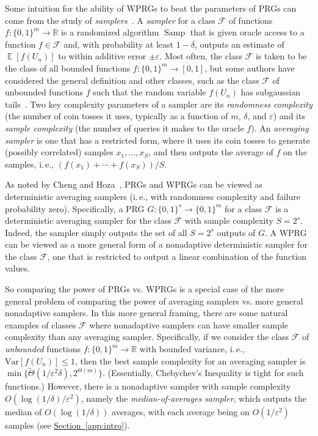 \documentclass[11pt]{article}
\numberwithin{equation}{section}
\theoremstyle{definition}
\theoremstyle{plain}
\newcommand{\ie}{i.\,e.}
\newcommand{\expref}[2]{\hyperref[#2]{#1~\ref{#2}}}
\newcommand{\eps}{\varepsilon}
\newcommand{\zo}{\{0,1\}}
\newcommand{\cF}{\mathcal{F}}
\newcommand{\bbR}{\mathbb{R}}
\DeclareMathOperator*{\E}{\mathbb{E}}
\DeclareMathOperator{\Samp}{Samp}
\begin{document}
Some intuition for the ability of WPRGs to beat the parameters of PRGs can come from
the study of \emph{samplers}~\cite{Goldreich97}.  A \emph{sampler} for a class $\cF$ of
functions $f : \zo^m\rightarrow \bbR$ is %
a 
%
randomized algorithm $\Samp$ that is given 
oracle access to a function $f\in \cF$ and, with probability at least $1-\delta$, outputs an estimate of $\E[f(U_n)]$ to within additive error $\pm \eps$. Most often, the class $\cF$ is taken to be the class of all bounded functions $f : \zo^m \rightarrow [0,1]$, but some
%
authors  %
have considered the general definition and other classes, such as the class $\cF$ of unbounded functions $f$ such that the random variable $f(U_n)$ has subgaussian tails~\cite{Blasiok18,Agrawal19}.  Two key complexity parameters of a sampler are its \emph{randomness complexity} (the number of coin tosses it uses, typically as a function of $m$, $\delta$, and $\eps$)  and its 
\emph{sample complexity} (the number of queries it makes to the oracle $f$).
An \emph{averaging sampler} is one that has a restricted form, where it uses its coin tosses to generate (possibly correlated) samples $x_1,\ldots,x_S$, and then outputs the average of $f$
on the samples, \ie, $(f(x_1)+\cdots+f(x_S))/S$.

As noted by Cheng and Hoza~\cite{ChengHo20}, PRGs and WPRGs can be viewed as deterministic averaging samplers (\ie, with randomness complexity and failure probability zero).  Specifically,
a PRG $G : \zo^s\rightarrow \zo^m$ for a class $\cF$ is a deterministic averaging sampler for the class $\cF$ with sample complexity $S=2^s$.  Indeed, the sampler simply outputs the set of all $S=2^s$ outputs of $G$. A WPRG can be viewed as a more general form of a nonadaptive deterministic sampler for the class $\cF$, one that is restricted to output a linear combination of the function values.

So comparing the power of PRGs vs. WPRGs is a special case of the more general problem of comparing the power of averaging samplers vs. more general nonadaptive samplers.  In this more general framing, there are some natural examples of classes $\cF$ where nonadaptive samplers can have smaller sample complexity than any averaging sampler.  Specifically, if we consider the class $\cF$ of \emph{unbounded} functions $f : \zo^m\rightarrow \bbR$ with bounded variance, \ie, $\mathrm{Var}[f(U_n)]\leq 1$, then the best sample complexity for an averaging sampler is
$\min\{\widetilde{\Theta}(1/\eps^2\delta),2^{\Theta(m)}\}$. (Essentially, Chebychev's Inequality is tight for such functions.)  However, there is a nonadaptive sampler with sample complexity $O(\log(1/\delta)/\eps^2)$, namely the \emph{median-of-averages sampler}, which outputs the median of $O(\log(1/\delta))$ averages, with each average being on $O(1/\eps^2)$ samples (see \expref{Section}{app:intro}).
\end{document}
